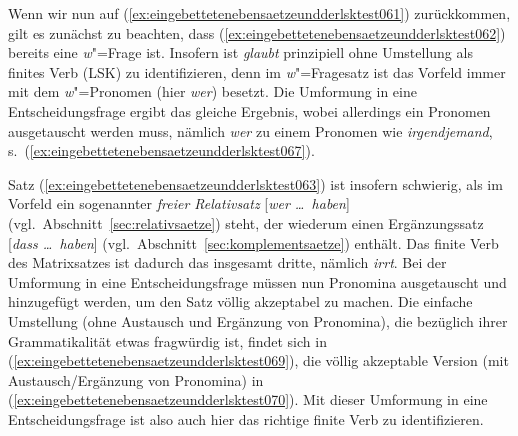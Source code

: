 \begin{exe}
\end{exe}

Wenn wir nun auf (\ref{ex:eingebettetenebensaetzeundderlsktest061}) zurückkommen, gilt es zunächst zu beachten, dass (\ref{ex:eingebettetenebensaetzeundderlsktest062}) bereits eine \textit{w}"=Frage ist.
Insofern ist \textit{glaubt} prinzipiell ohne Umstellung als finites Verb (LSK) zu identifizieren, denn im \textit{w}"=Fragesatz ist das Vorfeld immer mit dem \textit{w}"=Pro\-no\-men (hier \textit{wer}) besetzt.
Die Umformung in eine Entscheidungsfrage ergibt das gleiche Ergebnis, wobei allerdings ein Pronomen ausgetauscht werden muss, nämlich \textit{wer} zu einem Pronomen wie \textit{irgendjemand}, s.\ (\ref{ex:eingebettetenebensaetzeundderlsktest067}).

\begin{exe}
\end{exe}

Satz (\ref{ex:eingebettetenebensaetzeundderlsktest063}) ist insofern schwierig, als im Vorfeld ein sogenannter \textit{freier Relativsatz} [\textit{wer \ldots\ haben}] (vgl.\ Abschnitt~\ref{sec:relativsaetze}) steht, der wiederum einen Ergänzungssatz [\textit{dass \ldots\ haben}] (vgl.\ Abschnitt~\ref{sec:komplementsaetze}) enthält.
Das finite Verb des Matrixsatzes ist dadurch das insgesamt dritte, nämlich \textit{irrt}.
Bei der Umformung in eine Entscheidungsfrage müssen nun Pronomina ausgetauscht und hinzugefügt werden, um den Satz völlig akzeptabel zu machen.
Die einfache Umstellung (ohne Austausch und Ergänzung von Pronomina), die bezüglich ihrer Grammatikalität etwas fragwürdig ist, findet sich in (\ref{ex:eingebettetenebensaetzeundderlsktest069}), die völlig akzeptable Version (mit Austausch\slash Ergänzung von Pronomina) in (\ref{ex:eingebettetenebensaetzeundderlsktest070}).
Mit dieser Umformung in eine Entscheidungsfrage ist also auch hier das richtige finite Verb zu identifizieren.

\begin{exe}
  \ex\label{ex:eingebettetenebensaetzeundderlsktest068}
  \begin{xlist}
  \end{xlist}
\end{exe}

